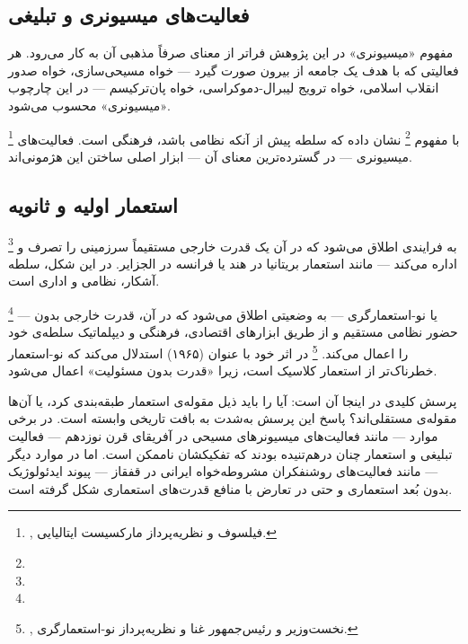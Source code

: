 \subsection{فعالیت‌های میسیونری و تبلیغی}
\label{subsec:ch01-missionary}

مفهوم «میسیونری» در این پژوهش فراتر از معنای صرفاً مذهبی آن به
کار می‌رود. هر فعالیتی که با هدف 
یک جامعه از بیرون صورت گیرد --- خواه مسیحی‌سازی، خواه صدور انقلاب
اسلامی، خواه ترویج لیبرال-دموکراسی، خواه پان‌ترکیسم ---
در این چارچوب «میسیونری» محسوب می‌شود.

\footnote{,
فیلسوف و نظریه‌پرداز مارکسیست ایتالیایی.}
با مفهوم \footnote{}
نشان داده که سلطه پیش از آنکه نظامی باشد، فرهنگی
است. فعالیت‌های میسیونری ---
در گسترده‌ترین معنای آن --- ابزار اصلی ساختن این هژمونی‌اند.

\subsection{استعمار اولیه و ثانویه}
\label{subsec:ch01-colonialism}


\begin{tcolorbox}[defbox, title={تعریف: استعمار اولیه و ثانویه}]
\footnote{}
به فرایندی اطلاق می‌شود که در آن یک قدرت خارجی مستقیماً سرزمینی را
تصرف و اداره می‌کند --- مانند استعمار بریتانیا در هند یا فرانسه در
الجزایر. در این شکل، سلطه آشکار، نظامی و اداری است.

\footnote{}
--- یا نو-استعمارگری --- به وضعیتی اطلاق می‌شود که در آن، قدرت
خارجی بدون حضور نظامی مستقیم و از طریق ابزارهای اقتصادی، فرهنگی
و دیپلماتیک سلطه‌ی خود را اعمال می‌کند. %
\footnote{,
نخست‌وزیر و رئیس‌جمهور غنا و نظریه‌پرداز نو-استعمارگری.}
در اثر خود با عنوان  (۱۹۶۵) استدلال می‌کند که نو-استعمار خطرناک‌تر از
استعمار کلاسیک است، زیرا «قدرت بدون مسئولیت» اعمال
می‌شود.
\end{tcolorbox}

پرسش کلیدی در اینجا آن است: آیا  را باید ذیل مقوله‌ی استعمار طبقه‌بندی کرد، یا آن‌ها
مقوله‌ی مستقلی‌اند؟ پاسخ این پرسش به‌شدت به بافت تاریخی وابسته است.
در برخی موارد --- مانند فعالیت‌های میسیونرهای مسیحی در آفریقای
قرن نوزدهم --- فعالیت تبلیغی و استعمار چنان درهم‌تنیده بودند که
تفکیکشان ناممکن
است.
اما در موارد دیگر --- مانند فعالیت‌های روشنفکران مشروطه‌خواه ایرانی
در قفقاز --- پیوند ایدئولوژیک بدون بُعد استعماری و حتی در تعارض با
منافع قدرت‌های استعماری شکل گرفته است.

